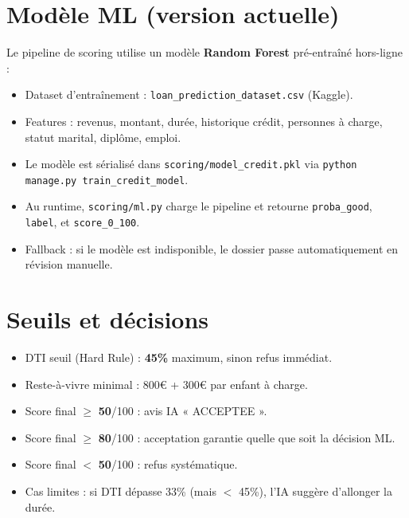 \documentclass[12pt,a4paper]{report}
\begin{document}
\section{Modèle ML (version actuelle)}
Le pipeline de scoring utilise un modèle \textbf{Random Forest} pré-entraîné hors-ligne :
\begin{itemize}[leftmargin=1.3cm]
    \item Dataset d'entraînement : \texttt{loan\_prediction\_dataset.csv} (Kaggle).
    \item Features : revenus, montant, durée, historique crédit, personnes à charge, statut marital, diplôme, emploi.
    \item Le modèle est sérialisé dans \texttt{scoring/model\_credit.pkl} via \texttt{python manage.py train\_credit\_model}.
    \item Au runtime, \texttt{scoring/ml.py} charge le pipeline et retourne \texttt{proba\_good}, \texttt{label}, et \texttt{score\_0\_100}.
    \item Fallback : si le modèle est indisponible, le dossier passe automatiquement en révision manuelle.
\end{itemize}

\section{Seuils et décisions}
\begin{itemize}[leftmargin=1.3cm]
    \item DTI seuil (Hard Rule) : \textbf{45\%} maximum, sinon refus immédiat.
    \item Reste-à-vivre minimal : 800€ + 300€ par enfant à charge.
    \item Score final $\geq$ \textbf{50}/100 : avis IA « ACCEPTEE ».
    \item Score final $\geq$ \textbf{80}/100 : acceptation garantie quelle que soit la décision ML.
    \item Score final $<$ \textbf{50}/100 : refus systématique.
    \item Cas limites : si DTI dépasse 33\% (mais $<$ 45\%), l'IA suggère d'allonger la durée.
\end{itemize}
\end{document}
